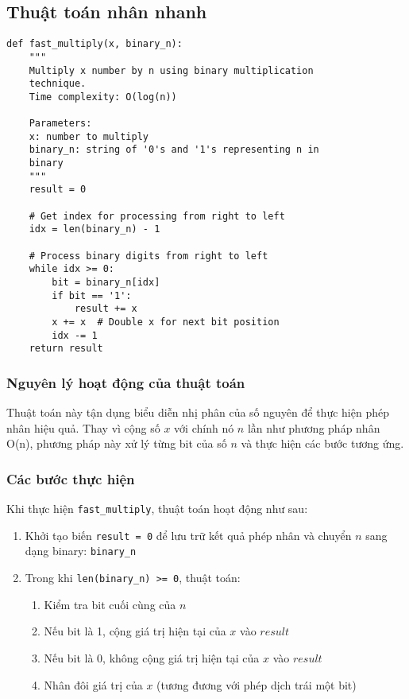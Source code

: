 \subsection{Thuật toán nhân nhanh}
\begin{verbatim}
def fast_multiply(x, binary_n):
    """
    Multiply x number by n using binary multiplication 
    technique.
    Time complexity: O(log(n))
    
    Parameters:
    x: number to multiply
    binary_n: string of '0's and '1's representing n in
    binary
    """
    result = 0
    
    # Get index for processing from right to left
    idx = len(binary_n) - 1
    
    # Process binary digits from right to left 
    while idx >= 0:
        bit = binary_n[idx]
        if bit == '1':
            result += x
        x += x  # Double x for next bit position
        idx -= 1
    return result
\end{verbatim}
\subsubsection{Nguyên lý hoạt động của thuật toán}

Thuật toán này tận dụng biểu diễn nhị phân của số nguyên để thực hiện phép nhân hiệu quả. Thay vì cộng số $x$ với chính nó $n$ lần như phương pháp nhân O(n), phương pháp này xử lý từng bit của số $n$  và thực hiện các bước tương ứng.

\subsubsection{Các bước thực hiện}

Khi thực hiện \texttt{fast\_multiply}, thuật toán hoạt động như sau:

\begin{enumerate}[label=\alph*)]
    \item Khởi tạo biến \texttt{result = 0} để lưu trữ kết quả phép nhân và chuyển $n$ sang dạng binary: \texttt{binary\_n} 
    \item Trong khi \texttt{len(binary\_n) >= 0}, thuật toán:
        \begin{enumerate}[label=b\arabic*)]
            \item Kiểm tra bit cuối cùng của $n$
            \item Nếu bit là 1, cộng giá trị hiện tại của $x$ vào $result$
            \item Nếu bit là 0, không cộng giá trị hiện tại của $x$ vào $result$
            \item Nhân đôi giá trị của $x$ (tương đương với phép dịch trái một bit)
        \end{enumerate}
\end{enumerate}

